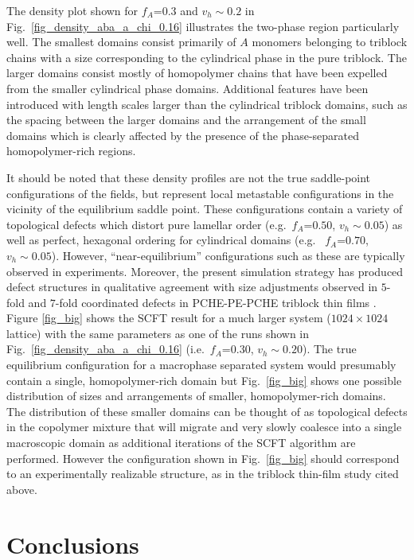 \documentclass[onecolumn,amsmath,amssymb,floatfix]{elsart}
\begin{document}
The density plot shown for $f_A$=$0.3$ and $v_h \sim 0.2$ in
Fig.~\ref{fig_density_aba_a_chi_0.16} illustrates the two-phase region particularly well.
The smallest domains consist primarily of $A$ monomers belonging to
triblock chains with a size corresponding to the cylindrical phase
in the pure triblock.
The larger domains consist mostly of homopolymer chains that have been expelled
from the smaller cylindrical phase domains.
Additional features have been introduced with length scales larger than
the cylindrical triblock domains, such as the spacing between the larger
domains and the arrangement of the small domains which
is clearly affected by the presence of the phase-separated homopolymer-rich regions.


It should be noted that these density profiles are not the true
saddle-point configurations of the fields, but represent local
metastable configurations in the vicinity of the equilibrium
saddle point.
These configurations contain a variety of
topological defects which distort pure lamellar order
(e.g.~$f_A$=$0.50$, $v_h \sim 0.05$) as well as perfect, hexagonal
ordering for cylindrical domains (e.g.~ $f_A$=$0.70$, $v_h \sim 0.05$).
However, ``near-equilibrium'' configurations such as these
are typically observed in experiments.
Moreover, the present simulation strategy has produced defect structures in
qualitative agreement with size adjustments observed in $5$-fold
and $7$-fold coordinated defects in PCHE-PE-PCHE triblock thin films \cite{hammond03}.
Figure \ref{fig_big} shows the SCFT result
for a much larger system ($1024 \times 1024$ lattice) with the same
parameters as one of the runs shown in
Fig.~\ref{fig_density_aba_a_chi_0.16} (i.e.~$f_A$=$0.30$, $v_h \sim 0.20$).
The true equilibrium configuration for a macrophase
separated system would presumably contain a single,
homopolymer-rich domain but Fig.~\ref{fig_big} shows one possible
distribution of sizes and arrangements of smaller,
homopolymer-rich domains.
The distribution of these smaller
domains can be thought of as topological defects in the copolymer
mixture that will migrate and very slowly coalesce into a single
macroscopic domain as additional iterations of the SCFT algorithm are performed.
However the configuration shown in Fig.~\ref{fig_big}
should correspond to an experimentally realizable structure, as in
the triblock thin-film study cited above.



\section{Conclusions}
\label{sec_conclusions}
\end{document}

